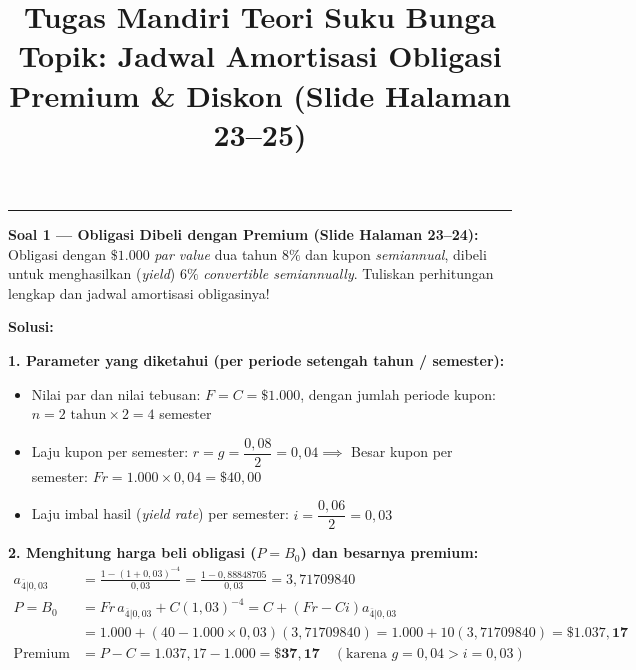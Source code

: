 \documentclass[10.5pt,a4paper]{article}
\title{\vspace{-1.6cm}\textbf{Tugas Mandiri Teori Suku Bunga}\\\large Topik: Jadwal Amortisasi Obligasi Premium \& Diskon (Slide Halaman 23--25)\vspace{-0.9cm}}
\author{}
\date{}
\begin{document}
\maketitle

\vspace{-0.6em}
\hrule
\vspace{0.6em}

\begin{tcolorbox}
\textbf{Soal 1 --- Obligasi Dibeli dengan Premium (Slide Halaman 23--24):}\\
Obligasi dengan $\$1.000$ \textit{par value} dua tahun $8\%$ dan kupon \textit{semiannual}, dibeli untuk menghasilkan (\textit{yield}) $6\%$ \textit{convertible semiannually}. Tuliskan perhitungan lengkap dan jadwal amortisasi obligasinya!
\end{tcolorbox}

\textbf{Solusi:}

\textbf{1. Parameter yang diketahui (per periode setengah tahun / semester):}
\begin{itemize}[leftmargin=1.5em, topsep=0pt, itemsep=0pt]
    \item Nilai par dan nilai tebusan: $F = C = \$1.000$, dengan jumlah periode kupon: $n = 2 \text{ tahun} \times 2 = 4$ semester
    \item Laju kupon per semester: $r = g = \dfrac{0{,}08}{2} = 0{,}04 \implies$ Besar kupon per semester: $Fr = 1.000 \times 0{,}04 = \$40{,}00$
    \item Laju imbal hasil (\textit{yield rate}) per semester: $i = \dfrac{0{,}06}{2} = 0{,}03$
\end{itemize}

\textbf{2. Menghitung harga beli obligasi ($P = B_0$) dan besarnya premium:}
\begin{align*}
    a_{\overline{4}|0{,}03} &= \frac{1 - (1 + 0{,}03)^{-4}}{0{,}03} = \frac{1 - 0{,}88848705}{0{,}03} = 3{,}71709840 \\[0.2em]
    P = B_0 &= Fr \, a_{\overline{4}|0{,}03} + C(1{,}03)^{-4} = C + (Fr - Ci) a_{\overline{4}|0{,}03} \\
    &= 1.000 + (40 - 1.000 \times 0{,}03)(3{,}71709840) = 1.000 + 10(3{,}71709840) = \mathbf{\$1.037{,}17} \\
    \text{Premium} &= P - C = 1.037{,}17 - 1.000 = \mathbf{\$37{,}17} \quad (\text{karena } g = 0{,}04 > i = 0{,}03)
\end{align*}
\end{document}
